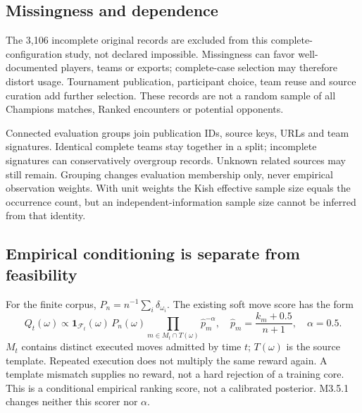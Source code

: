 \documentclass[10pt,a4paper]{article}
\newcommand{\F}{\mathcal{F}}
\begin{document}
\subsection{Missingness and dependence}
The 3,106 incomplete original records are excluded from this complete-configuration study, not declared impossible. Missingness can favor well-documented players, teams or exports; complete-case selection may therefore distort usage. Tournament publication, participant choice, team reuse and source curation add further selection. These records are not a random sample of all Champions matches, Ranked encounters or potential opponents.

Connected evaluation groups join publication IDs, source keys, URLs and team signatures. Identical complete teams stay together in a split; incomplete signatures can conservatively overgroup records. Unknown related sources may still remain. Grouping changes evaluation membership only, never empirical observation weights. With unit weights the Kish effective sample size equals the occurrence count, but an independent-information sample size cannot be inferred from that identity.

\subsection{Empirical conditioning is separate from feasibility}
For the finite corpus, $P_n=n^{-1}\sum_i\delta_{\omega_i}$. The existing soft move score has the form
\begin{equation}
 Q_t(\omega)\propto \mathbf{1}_{\F_t}(\omega)\,P_n(\omega)
 \prod_{m\in M_t\cap T(\omega)}\widehat p_m^{-\alpha},\quad
 \widehat p_m=\frac{k_m+0.5}{n+1},\quad\alpha=0.5.
\end{equation}
$M_t$ contains distinct executed moves admitted by time $t$; $T(\omega)$ is the source template. Repeated execution does not multiply the same reward again. A template mismatch supplies no reward, not a hard rejection of a training core. This is a conditional empirical ranking score, not a calibrated posterior. M3.5.1 changes neither this scorer nor $\alpha$.
\clearpage
\end{document}
